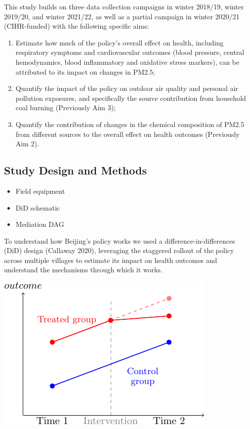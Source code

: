 \documentclass[
  letterpaper,
  DIV=11,
  numbers=noendperiod]{scrartcl}
\providecommand{\tightlist}{%
  \setlength{\itemsep}{0pt}\setlength{\parskip}{0pt}}\usepackage{longtable,booktabs,array}
\begin{document}
This study builds on three data collection campaigns in winter 2018/19,
winter 2019/20, and winter 2021/22, as well as a partial campaign in
winter 2020/21 (CIHR-funded) with the following specific aims:

\begin{enumerate}
\def\labelenumi{\arabic{enumi}.}
\item
  Estimate how much of the policy's overall effect on health, including
  respiratory symptoms and cardiovascular outcomes (blood pressure,
  central hemodynamics, blood inflammatory and oxidative stress
  markers), can be attributed to its impact on changes in PM2.5;
\item
  Quantify the impact of the policy on outdoor air quality and personal
  air pollution exposures, and specifically the source contribution from
  household coal burning (Previously Aim 3);
\item
  Quantify the contribution of changes in the chemical composition of
  PM2.5 from different sources to the overall effect on health outcomes
  (Previously Aim 2).
\end{enumerate}

\hypertarget{study-design-and-methods}{%
\subsection{Study Design and Methods}\label{study-design-and-methods}}

\begin{itemize}
\tightlist
\item
  Field equipment
\item
  DiD schematic
\item
  Mediation DAG
\end{itemize}

To understand how Beijing's policy works we used a
difference-in-differences (DiD) design (Callaway 2020), leveraging the
staggered rollout of the policy across multiple villages to estimate its
impact on health outcomes and understand the mechanisms through which it
works.

\includegraphics{hei-report_files/figure-pdf/unnamed-chunk-1-1.pdf}
\end{document}

